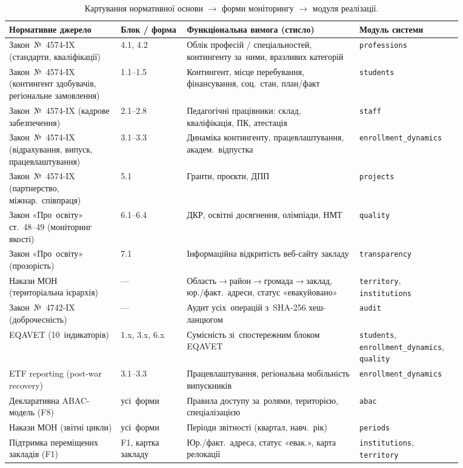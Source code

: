 \begin{table}[htbp]
\centering
\caption{Картування нормативної основи $\to$ форми моніторингу $\to$ модуля реалізації.}
\label{tab:traceability}
\scriptsize
\setlength\tabcolsep{3pt}
\renewcommand{\arraystretch}{1.10}
\begin{tabular}{|p{0.22\linewidth}|p{0.13\linewidth}|p{0.34\linewidth}|p{0.18\linewidth}|}
\hline
\textbf{Нормативне джерело} & \textbf{Блок / форма} & \textbf{Функціональна вимога (стисло)} & \textbf{Модуль системи} \\
\hline
Закон~№~4574-IX (стандарти, кваліфікації) & 4.1, 4.2 & Облік професій / спеціальностей, контингенту за~ними, вразливих категорій & \texttt{professions} \\
\hline
Закон~№~4574-IX (контингент здобувачів, регіональне замовлення) & 1.1--1.5 & Контингент, місце перебування, фінансування, соц.\ стан, план/факт & \texttt{students} \\
\hline
Закон~№~4574-IX (кадрове забезпечення) & 2.1--2.8 & Педагогічні працівники: склад, кваліфікація, ПК, атестація & \texttt{staff} \\
\hline
Закон~№~4574-IX (відрахування, випуск, працевлаштування) & 3.1--3.3 & Динаміка контингенту, працевлаштування, академ.\ відпустка & \texttt{enrollment\_dynamics} \\
\hline
Закон~№~4574-IX (партнерство, міжнар.\ співпраця) & 5.1 & Гранти, проєкти, ДПП & \texttt{projects} \\
\hline
Закон «Про~освіту» ст.~48--49 (моніторинг якості) & 6.1--6.4 & ДКР, освітні досягнення, олімпіади, НМТ & \texttt{quality} \\
\hline
Закон «Про~освіту» (прозорість) & 7.1 & Інформаційна відкритість веб-сайту закладу & \texttt{transparency} \\
\hline
Накази МОН (територіальна ієрархія) & --- & Область$\to$район$\to$громада$\to$заклад, юр./факт.\ адреси, статус «евакуйовано» & \texttt{territory}, \texttt{institutions} \\
\hline
Закон~№~4742-IX (доброчесність) & --- & Аудит усіх~операцій з~SHA-256 хеш-ланцюгом & \texttt{audit} \\
\hline
EQAVET (10~індикаторів) & 1.x, 3.x, 6.x & Сумісність зі~спостережним блоком EQAVET & \texttt{students}, \texttt{enrollment\_dynamics}, \texttt{quality} \\
\hline
ETF reporting (post-war recovery) & 3.1--3.3 & Працевлаштування, регіональна мобільність випускників & \texttt{enrollment\_dynamics} \\
\hline
Декларативна ABAC-модель (F8) & усі~форми & Правила доступу за~ролями, територією, спеціалізацією & \texttt{abac} \\
\hline
Накази МОН (звітні цикли) & усі~форми & Періоди звітності (квартал, навч.\ рік) & \texttt{periods} \\
\hline
Підтримка переміщених закладів (F1) & F1, картка закладу & Юр./факт.\ адреса, статус «евак.», карта релокації & \texttt{institutions}, \texttt{territory} \\
\hline
\end{tabular}
\end{table}

